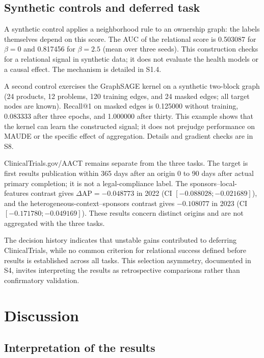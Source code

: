 \subsection{Synthetic controls and deferred task}

A synthetic control applies a neighborhood rule to an ownership graph: the labels themselves depend on this score. The AUC of the relational score is 0.503087 for $\beta=0$ and 0.817456 for $\beta=2.5$ (mean over three seeds)\cite{hgbcontrols}. This construction checks for a relational signal in synthetic data; it does not evaluate the health models or a causal effect. The mechanism is detailed in S1.4.

A second control exercises the GraphSAGE kernel on a synthetic two-block graph (24 products, 12 problems, 120 training edges, and 24 masked edges; all target nodes are known)\cite{hgbcode}. Recall@1 on masked edges is 0.125000 without training, 0.083333 after three epochs, and 1.000000 after thirty. This example shows that the kernel can learn the constructed signal; it does not prejudge performance on MAUDE or the specific effect of aggregation. Details and gradient checks are in S8.

ClinicalTrials.gov/AACT remains separate from the three tasks. The target is first results publication within 365 days after an origin 0 to 90 days after actual primary completion; it is not a legal-compliance label. The sponsors--local-features contrast gives $\Delta\mathrm{AP}=-0.048773$ in 2022 (CI $[-0.088028;-0.021689]$), and the heterogeneous-context--sponsors contrast gives $-0.108077$ in 2023 (CI $[-0.171780;-0.049169]$)\cite{hgb2026,hgbhistory}. These results concern distinct origins and are not aggregated with the three tasks.

The decision history indicates that unstable gains contributed to deferring ClinicalTrials, while no common criterion for relational success defined before results is established across all tasks. This selection asymmetry, documented in S4, invites interpreting the results as retrospective comparisons rather than confirmatory validation.

\section{Discussion}

\subsection{Interpretation of the results}

